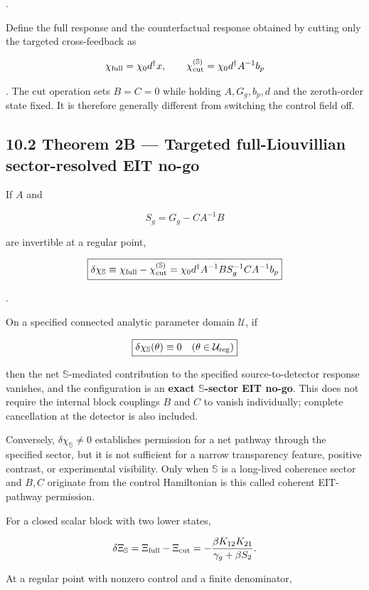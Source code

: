 \documentclass[
  10pt,
  a4paper,
]{article}
\begin{document}
.

Define the full response and the counterfactual response obtained by
cutting only the targeted cross-feedback as

\[
\chi_{\rm full}
=\chi_0d^\dagger x,
\qquad
\chi_{\rm cut}^{(\mathbb S)}
=\chi_0d^\dagger A^{-1}b_p
\]

. The cut operation sets \(B=C=0\) while holding \(A,G_g,b_p,d\) and the
zeroth-order state fixed. It is therefore generally different from
switching the control field off.

\subsection{10.2 Theorem 2B --- Targeted full-Liouvillian
sector-resolved EIT
no-go}\label{theorem-2b-targeted-full-liouvillian-sector-resolved-eit-no-go}

If \(A\) and

\[
S_g=G_g-CA^{-1}B
\]

are invertible at a regular point,

\[
\boxed{
\delta\chi_{\mathbb S}
\equiv
\chi_{\rm full}-\chi_{\rm cut}^{(\mathbb S)}
=
\chi_0d^\dagger A^{-1}B
S_g^{-1}CA^{-1}b_p
}
\]

.

On a specified connected analytic parameter domain \(\mathcal U\), if

\[
\boxed{
\delta\chi_{\mathbb S}(\theta)\equiv0
\quad(\theta\in\mathcal U_{\rm reg})
}
\]

then the net \(\mathbb S\)-mediated contribution to the specified
source-to-detector response vanishes, and the configuration is an
\textbf{exact \(\mathbb S\)-sector EIT no-go}. This does not require the
internal block couplings \(B\) and \(C\) to vanish individually;
complete cancellation at the detector is also included.

Conversely, \(\delta\chi_{\mathbb S}\neq0\) establishes permission for a
net pathway through the specified sector, but it is not sufficient for a
narrow transparency feature, positive contrast, or experimental
visibility. Only when \(\mathbb S\) is a long-lived coherence sector and
\(B,C\) originate from the control Hamiltonian is this called coherent
EIT-pathway permission.

For a closed scalar block with two lower states,

\[
\delta\Xi_{\mathbb S}
=\Xi_{\rm full}-\Xi_{\rm cut}
=-\frac{\beta K_{12}K_{21}}
{\gamma_g+\beta S_2}.
\]

At a regular point with nonzero control and a finite denominator,
\end{document}
